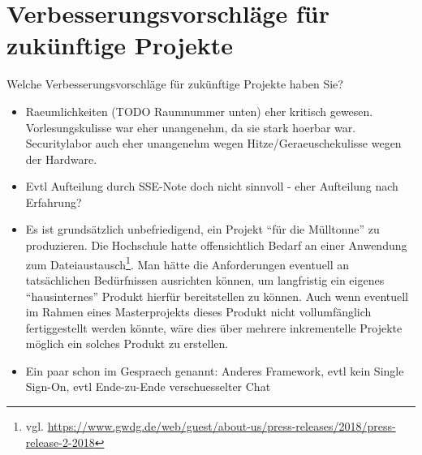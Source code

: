 \documentclass[12pt,DIV14,BCOR10mm,a4paper,parskip=half-,headsepline,headinclude,english,ngerman,bibliography=totocnumbered]{scrreprt}
\begin{document}
\chapter{Verbesserungsvorschläge für zukünftige Projekte}

Welche Verbesserungsvorschläge für zukünftige Projekte haben Sie?

\begin{itemize}
  \item Raeumlichkeiten (TODO Raumnummer unten) eher kritisch gewesen. Vorlesungskulisse war eher unangenehm, da sie stark hoerbar war. Securitylabor auch eher unangenehm wegen Hitze/Geraeuschekulisse wegen der Hardware.
  \item Evtl Aufteilung durch SSE-Note doch nicht sinnvoll - eher Aufteilung nach Erfahrung?
  \item Es ist grundsätzlich unbefriedigend, ein Projekt \enquote{für die Mülltonne} zu produzieren. Die Hochschule hatte offensichtlich Bedarf an einer Anwendung zum Dateiaustausch\footnote{vgl. \url{https://www.gwdg.de/web/guest/about-us/press-releases/2018/press-release-2-2018}}. Man hätte die Anforderungen eventuell an tatsächlichen Bedürfnissen ausrichten können, um langfristig ein eigenes \enquote{hausinternes} Produkt hierfür bereitstellen zu können. Auch wenn eventuell im Rahmen eines Masterprojekts dieses Produkt nicht vollumfänglich fertiggestellt werden könnte, wäre dies über mehrere inkrementelle Projekte möglich ein solches Produkt zu erstellen.
  \item Ein paar schon im Gespraech genannt: Anderes Framework, evtl kein Single Sign-On, evtl Ende-zu-Ende verschuesselter Chat
\end{itemize}

\printbibliography

\printacronyms[title=Abkürzungsverzeichnis,toctitle=Abkürzungsverzeichnis]
\printglossary[title=Glossar,toctitle=Glossar,type=main]

\iftotalfigures
  \listoffigures
\fi


\begin{appendices}

\end{appendices}
\end{document}
